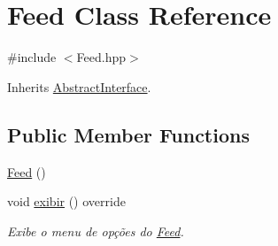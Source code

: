 \hypertarget{class_feed}{}\section{Feed Class Reference}
\label{class_feed}


{\ttfamily \#include $<$Feed.\+hpp$>$}



Inherits \hyperlink{class_abstract_interface}{Abstract\+Interface}.

\subsection*{Public Member Functions}
\begin{DoxyCompactItemize}
\item 
\hyperlink{class_feed_a925b84cc511eada7ee7e4019a0d48710}{Feed} ()
\item 
void \hyperlink{class_feed_abc572553a07c93e0ff4c690b210d4c06}{exibir} () override
\begin{DoxyCompactList}\small\item\em Exibe o menu de opções do \hyperlink{class_feed}{Feed}. \end{DoxyCompactList}\end{DoxyCompactItemize}
